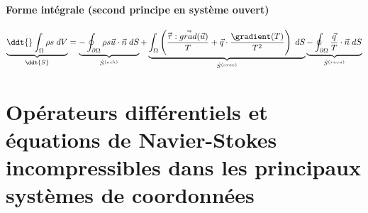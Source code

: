 \paragraph{Forme intégrale (second principe en système ouvert)}
\begin{equation}
		\underbrace{\ddt{} \int_{\Omega} \rho s \; dV
		}_{\ddt{S} }		 
		= \underbrace{  - \oint_{\partial \Omega}  \rho s \vec{u} \cdot \vec{n} \; dS
		}_{\dot{S}^{(ech)}}
		+ 
		\underbrace{ \int_{\Omega} \left( \frac{\mytensor{\tau} : \mytensor{grad}(\vec{u})}{T} + \vec{q} 		\cdot \frac{\gradient(T)}{T^2} 
		\right)   \; dS 
		}_{\dot{S}^{(cree)}} 
		 \underbrace{ - \oint_{\partial \Omega} \frac{\vec{q}}{T} \cdot \vec{n} \; dS
		}_{\dot{S}^{(recu)}} 
		\label{eq:bilan_global_eulerien_s}
\end{equation}








\section{Opérateurs différentiels et équations de Navier-Stokes incompressibles dans les principaux systèmes de coordonnées}










